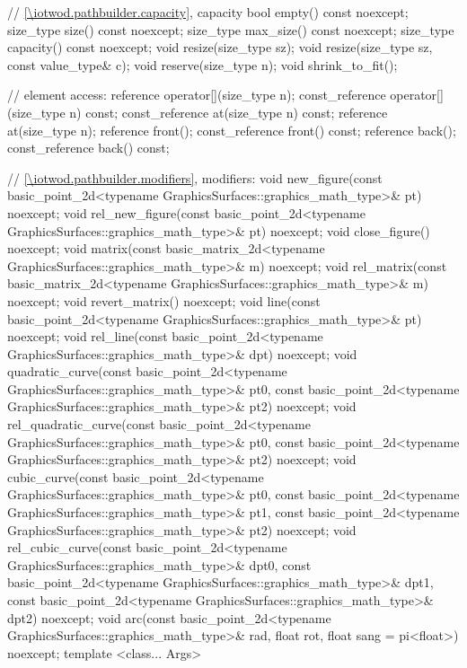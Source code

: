 \begin{codeblock}
{{    // \ref{\iotwod.pathbuilder.capacity}, capacity
    bool empty() const noexcept;
    size_type size() const noexcept;
    size_type max_size() const noexcept;
    size_type capacity() const noexcept;
    void resize(size_type sz);
    void resize(size_type sz, const value_type& c);
    void reserve(size_type n);
    void shrink_to_fit();

    // element access:
    reference operator[](size_type n);
    const_reference operator[](size_type n) const;
    const_reference at(size_type n) const;
    reference at(size_type n);
    reference front();
    const_reference front() const;
    reference back();
    const_reference back() const;

    // \ref{\iotwod.pathbuilder.modifiers}, modifiers:
    void new_figure(const basic_point_2d<typename
      GraphicsSurfaces::graphics_math_type>& pt) noexcept;
    void rel_new_figure(const basic_point_2d<typename
      GraphicsSurfaces::graphics_math_type>& pt) noexcept;
    void close_figure() noexcept;
    void matrix(const basic_matrix_2d<typename
      GraphicsSurfaces::graphics_math_type>& m) noexcept;
    void rel_matrix(const basic_matrix_2d<typename
      GraphicsSurfaces::graphics_math_type>& m) noexcept;
    void revert_matrix() noexcept;
    void line(const basic_point_2d<typename GraphicsSurfaces::graphics_math_type>& pt) noexcept;
    void rel_line(const basic_point_2d<typename
      GraphicsSurfaces::graphics_math_type>& dpt) noexcept;
    void quadratic_curve(const basic_point_2d<typename
      GraphicsSurfaces::graphics_math_type>& pt0, const basic_point_2d<typename
      GraphicsSurfaces::graphics_math_type>& pt2) noexcept;
    void rel_quadratic_curve(const basic_point_2d<typename
      GraphicsSurfaces::graphics_math_type>& pt0, const basic_point_2d<typename
      GraphicsSurfaces::graphics_math_type>& pt2) noexcept;
    void cubic_curve(const basic_point_2d<typename
      GraphicsSurfaces::graphics_math_type>& pt0, const basic_point_2d<typename
      GraphicsSurfaces::graphics_math_type>& pt1, const basic_point_2d<typename
      GraphicsSurfaces::graphics_math_type>& pt2) noexcept;
    void rel_cubic_curve(const basic_point_2d<typename
      GraphicsSurfaces::graphics_math_type>& dpt0, const basic_point_2d<typename
      GraphicsSurfaces::graphics_math_type>& dpt1, const basic_point_2d<typename
      GraphicsSurfaces::graphics_math_type>& dpt2) noexcept;
    void arc(const basic_point_2d<typename
      GraphicsSurfaces::graphics_math_type>& rad, float rot, float sang = pi<float>) noexcept;
    template <class... Args>
}}
\end{codeblock}
